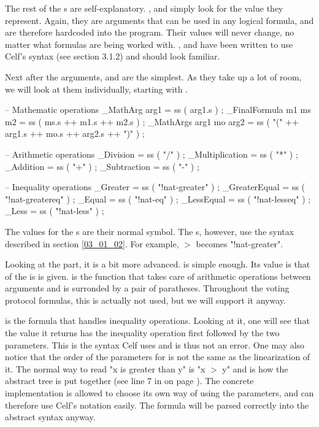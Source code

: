 The rest of the s are self-explanatory. ,  and  simply look for the value they represent. Again, they are arguments that can be used in any logical formula, and are therefore hardcoded into the program. Their values will never change, no matter what formulas are being worked with. , and  have been written to use Celf's syntax (see section 3.1.2) and should look familiar.

Next after the arguments,  and  are the simplest. As they take up a lot of room, we will look at them individually, starting with .

\begin{lstgf}
        -- Mathematic operations
        _MathArg arg1                   = ss ( arg1.s ) ;
        _FinalFormula m1 ms m2          = ss ( ms.s ++ m1.s ++ m2.s ) ;
        _MathArgs arg1 mo arg2          = ss ( "(" ++ arg1.s ++ mo.s ++ arg2.s ++ ")" ) ;

        -- Arithmetic operations
        _Division                       = ss ( "/" ) ;
        _Multiplication                 = ss ( "*" ) ;
        _Addition                       = ss ( "+" ) ;
        _Subtraction                    = ss ( "-" ) ;

        -- Inequality operations
        _Greater                        = ss ( "!nat-greater" ) ;
        _GreaterEqual                   = ss ( "!nat-greatereq" ) ;
        _Equal                          = ss ( "!nat-eq" ) ;
        _LessEqual                      = ss ( "!nat-lesseq" ) ;
        _Less                           = ss ( "!nat-less" ) ;
\end{lstgf}
The values for the s are their normal symbol. The s, however, use the syntax described in section \ref{03_01_02}. For example, $>$ becomes "!nat-greater".

Looking at the  part, it is a bit more advanced.  is simple enough. Its value is that of the  is is given.  is the function that takes care of arithmetic operations between arguments and is surronded by a pair of paratheses. Throughout the voting protocol formulas, this is actually not used, but we will support it anyway.

 is the formula that handles inequality operations. Looking at it, one will see that the value it returns has the inequality operation first followed by the two parameters. This is the syntax Celf uses and is thus not an error. One may also notice that the order of the parameters for  is not the same as the linearization of it. The normal way to read "x is greater than y" is "x $>$ y" and is how the abstract tree is put together (see line 7 in  on page \pageref{code:04_01_C04}). The concrete implementation is allowed to choose its own way of using the parameters, and can therefore use Celf's notation easily. The formula will be parsed correctly into the abstract syntax anyway.

